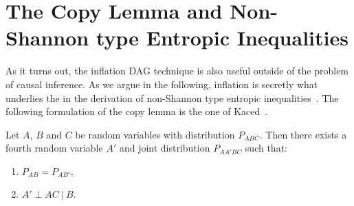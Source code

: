 \section{The Copy Lemma and Non-Shannon type Entropic Inequalities}\label{sec:NonShannon}

As it turns out, the inflation DAG technique is also useful outside of the problem of causal inference. As we argue in the following, inflation is secretly what underlies the  in the derivation of non-Shannon type entropic inequalities~\cite[Chapter~15]{yeung_network_2008}. The following formulation of the copy lemma is the one of Kaced~\cite{kaced_equivalence_2013}.

\begin{lemma}
	Let $A$, $B$ and $C$ be random variables with distribution $P_{ABC}$. Then there exists a fourth random variable $A'$ and joint distribution $P_{AA'BC}$ such that:
	\begin{enumerate}
		\item $P_{AB} = P_{AB'}$,
		\item $A' \perp AC \:|\: B$.
	\label{copylemma}
	\end{enumerate}
\end{lemma}

